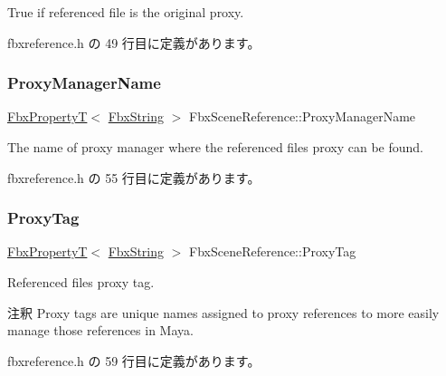 {\ttfamily True} if referenced file is the original proxy. 



 fbxreference.\+h の 49 行目に定義があります。

\mbox{\label{class_fbx_scene_reference_aac92c29ead8f25eea0dbaf0649b49c96}} 
\subsubsection{\texorpdfstring{Proxy\+Manager\+Name}{ProxyManagerName}}
{\footnotesize\ttfamily \hyperlink{class_fbx_property_t}{Fbx\+PropertyT}$<$ \hyperlink{class_fbx_string}{Fbx\+String} $>$ Fbx\+Scene\+Reference\+::\+Proxy\+Manager\+Name}



The name of proxy manager where the referenced file\textquotesingle{}s proxy can be found. 



 fbxreference.\+h の 55 行目に定義があります。

\mbox{\label{class_fbx_scene_reference_a0ced8e6b90ec7d085b82c194188d89bb}} 
\subsubsection{\texorpdfstring{Proxy\+Tag}{ProxyTag}}
{\footnotesize\ttfamily \hyperlink{class_fbx_property_t}{Fbx\+PropertyT}$<$ \hyperlink{class_fbx_string}{Fbx\+String} $>$ Fbx\+Scene\+Reference\+::\+Proxy\+Tag}

Referenced file\textquotesingle{}s proxy tag. \begin{DoxyRemark}{注釈}
Proxy tags are unique names assigned to proxy references to more easily manage those references in Maya. 
\end{DoxyRemark}


 fbxreference.\+h の 59 行目に定義があります。

\mbox{\label{class_fbx_scene_reference_a66ad8666d23493dc9e20cb7fa411963b}} 
